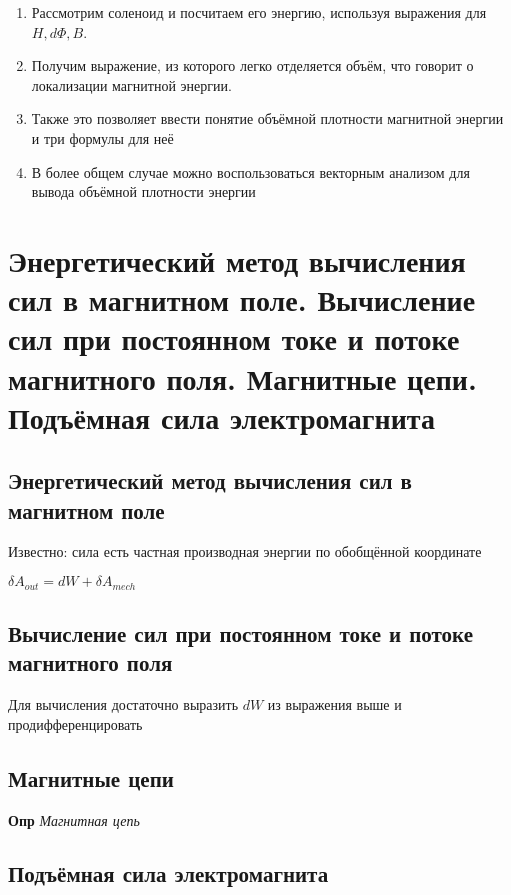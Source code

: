 \documentclass[a4paper, 14pt]{article}
\begin{document}
    \begin{enumerate}
        \item Рассмотрим соленоид и посчитаем его энергию, используя выражения для $H, d \Phi, B$.
        \item Получим выражение, из которого легко отделяется объём, что говорит о локализации магнитной энергии.
        \item Также это позволяет ввести понятие объёмной плотности магнитной энергии и три формулы для неё
        \item В более общем случае можно воспользоваться векторным анализом для вывода объёмной плотности энергии
    \end{enumerate}
    
    \section{Энергетический метод вычисления сил в магнитном поле.
    Вычисление сил при постоянном токе и потоке магнитного поля.
    Магнитные цепи.
    Подъёмная сила электромагнита}
    
    \subsection{Энергетический метод вычисления сил в магнитном поле}
    
    Известно: сила есть частная производная энергии по обобщённой координате
    
    $\delta A_{out} = dW + \delta A_{mech}$
    
    \subsection{Вычисление сил при постоянном токе и потоке магнитного поля}
    
    Для вычисления достаточно выразить $dW$ из выражения выше и продифференцировать
    
    \subsection{Магнитные цепи}
    
    \textbf{Опр} \textit{Магнитная цепь}
    
    \subsection{Подъёмная сила электромагнита}
    
\end{document}
